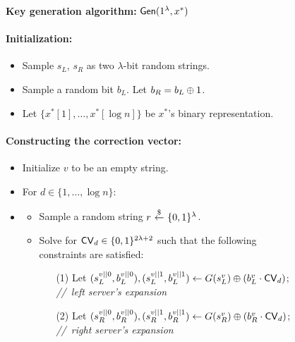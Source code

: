 \begin{figure}[p]
    \begin{minipage}{\textwidth}
        \begin{mdframed}
            \begin{center}
                \textbf{Key generation algorithm:} ${\sf Gen}(1^\lambda, x^*)$
            \end{center}
            
            \paragraph{Initialization:} 
            \begin{itemize}
                \item Sample $s_L$, $s_R$ as two $\lambda$-bit random strings. 
                \item Sample a random bit $b_L$. Let $b_R=b_L\oplus 1$. 
                \item Let $\{x^*[1],\dots,x^*[\log n]\}$ be $x^*$'s binary representation.
            \end{itemize}
            
            
            \paragraph{Constructing the correction vector:}  
            \begin{itemize}[label={},leftmargin=*]
                \item Initialize $v$ to be an empty string.
                \item For $d\in \{1,\dots, \log n\}$: 
                \item 
                \begin{itemize}
                    \item Sample a random string $r~{\overset{\$}{\leftarrow}}~ \{0,1\}^{\lambda}$.
                    \item Solve for 
${\sf CV}_d\in\{0,1\}^{2\lambda+2}$ such that the following constraints
are satisfied:
                    \begin{enumerate}
                        \item[(1)] Let $(s^{v||0}_L, b^{v||0}_L), (s^{v||1}_L, b^{v||1}_L) \leftarrow G(s^v_L) \oplus (b^v_L \cdot {\sf CV}_d)$; 
\hfill \textit{//~left server's expansion}
                        \item[(2)] Let $(s^{v||0}_R, b^{v||0}_R), (s^{v||1}_R, b^{v||1}_R) \leftarrow G(s^v_R) \oplus (b^v_R \cdot {\sf CV}_d)$; 
\hfill \textit{//~right server's expansion}


\end{enumerate}
\end{itemize}
\end{itemize}
\end{mdframed}
\end{minipage}
\end{figure}
